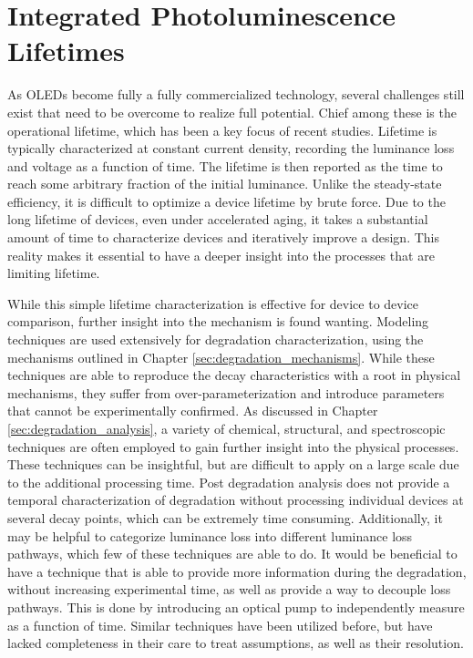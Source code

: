 \documentclass[../thesis.tex]{subfiles}
\begin{document}
\chapter{Integrated Photoluminescence Lifetimes} \label{sec:integrated_lifetime}
As OLEDs become fully a fully commercialized technology, several challenges still exist that need to be overcome to realize full potential.
Chief among these is the operational lifetime, which has been a key focus of recent studies.\supercite{Scholz2015,DeMoraes2011,Seifert2013b,Moraes2011,Burrows1994,Seifert2013b}
Lifetime is typically characterized at constant current density, recording the luminance loss and voltage as a function of time.
The lifetime is then reported as the time to reach some arbitrary fraction of the initial luminance.
Unlike the steady-state efficiency, it is difficult to optimize a device lifetime by brute force.  
Due to the long lifetime of devices, even under accelerated aging, it takes a substantial amount of time to characterize devices and iteratively improve a design.
This reality makes it essential to have a deeper insight into the processes that are limiting lifetime.

While this simple lifetime characterization is effective for device to device comparison, further insight into the mechanism is found wanting.
Modeling techniques are used extensively for degradation characterization, using the mechanisms outlined in Chapter \ref{sec:degradation_mechanisms}.\supercite{Giebink2008a,Ingram2017,Coburn2017}
While these techniques are able to reproduce the decay characteristics with a root in physical mechanisms, they suffer from over-parameterization and introduce parameters that cannot be experimentally confirmed.
As discussed in Chapter \ref{sec:degradation_analysis}, a variety of chemical, structural, and spectroscopic techniques are often employed to gain further insight into the physical processes.\supercite{Seifert2013b,Moraes2011,Scholz2015,Wang2011a,Zhang2016}
These techniques can be insightful, but are difficult to apply on a large scale due to the additional processing time.
Post degradation analysis does not provide a temporal characterization of degradation without processing individual devices at several decay points, which can be extremely time consuming.
Additionally, it may be helpful to categorize luminance loss into different luminance loss pathways, which few of these techniques are able to do.
It would be beneficial to have a technique that is able to provide more information during the degradation, without increasing experimental time, as well as provide a way to decouple loss pathways.
This is done by introducing an optical pump to independently measure \pl as a function of time.
Similar techniques have been utilized before, but have lacked completeness in their care to treat assumptions, as well as their resolution.\supercite{Popovic2001,Kondakov2007d,Winter2008a}
\end{document}
